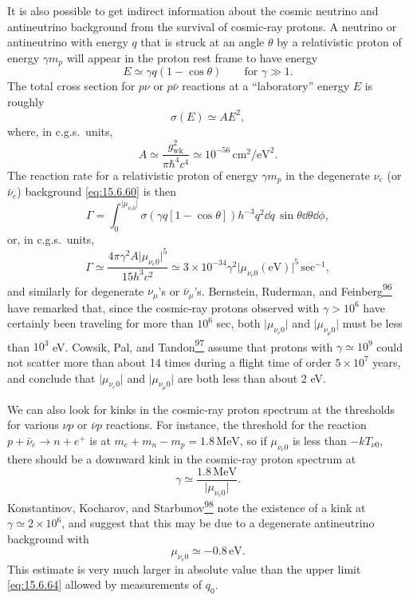 It is also possible to get indirect information about the cosmic neutrino and
antineutrino background from the survival of cosmic-ray protons. A neutrino or
antineutrino with energy \(q\) that is struck at an angle \(\theta\) by a
relativistic proton of energy \(\gamma m_p\) will appear in the proton rest
frame to have energy
\[
  E\simeq\gamma q(1-\cos\theta)
  \qquad\text{for }\gamma\gg1.
\]
The total cross section for \(p\nu\) or \(p\bar\nu\) reactions at a
``laboratory'' energy \(E\) is roughly
\[
  \sigma(E)\simeq AE^2,
\]
where, in c.g.s.\ units,
\[
  A
  \simeq
  \frac{g_{\mathrm{wk}}^2}{\pi\hbar^4c^4}
  \simeq
  10^{-56}\,\mathrm{cm^2/eV^2}.
\]
The reaction rate for a relativistic proton of energy \(\gamma m_p\) in the
degenerate \(\nu_e\) (or \(\bar\nu_e\)) background \eqref{eq:15.6.60} is then
\[
  \Gamma
  =
  \int_0^{\lvert\mu_{\nu_e0}\rvert}
  \sigma\!\left(\gamma q[1-\cos\theta]\right)
  h^{-3}q^2\dd q\,
  \sin\theta\dd\theta\dd\phi,
\]
or, in c.g.s.\ units,
\begin{equation}
  \Gamma
  \simeq
  \frac{4\pi\gamma^2A\lvert\mu_{\nu_e0}\rvert^5}
       {15h^3c^2}
  \simeq
  3\times10^{-34}\gamma^2
  \lvert\mu_{\nu_e0}(\mathrm{eV})\rvert^5\,\mathrm{sec^{-1}},
  \tag{15.6.68}\label{eq:15.6.68}
\end{equation}
and similarly for degenerate \(\nu_\mu\)'s or \(\bar\nu_\mu\)'s. Bernstein,
Ruderman, and Feinberg\hyperref[ch15-ref-96]{\textsuperscript{96}} have
remarked that, since the cosmic-ray protons observed with \(\gamma>10^6\)
have certainly been traveling for more than \(10^6\) sec, both
\(\lvert\mu_{\nu_e0}\rvert\) and \(\lvert\mu_{\nu_\mu0}\rvert\) must be less
than \(10^3\) eV. Cowsik, Pal, and
Tandon\hyperref[ch15-ref-97]{\textsuperscript{97}} assume that protons with
\(\gamma\simeq10^9\) could not scatter more than about 14 times during a
flight time of order \(5\times10^7\) years, and conclude that
\(\lvert\mu_{\nu_e0}\rvert\) and \(\lvert\mu_{\nu_\mu0}\rvert\) are both less
than about 2 eV.

We can also look for kinks in the cosmic-ray proton spectrum at the thresholds
for various \(\nu p\) or \(\bar\nu p\) reactions. For instance, the threshold
for the reaction \(p+\bar\nu_e\to n+e^+\) is at
\(m_e+m_n-m_p=1.8\,\mathrm{MeV}\), so if \(\mu_{\nu_e0}\) is less than
\(-kT_{\nu0}\), there should be a downward kink in the cosmic-ray proton
spectrum at
\begin{equation}
  \gamma
  \simeq
  \frac{1.8\,\mathrm{MeV}}{\lvert\mu_{\nu_e0}\rvert}.
  \tag{15.6.69}\label{eq:15.6.69}
\end{equation}
Konstantinov, Kocharov, and
Starbunov\hyperref[ch15-ref-98]{\textsuperscript{98}} note the existence of a
kink at \(\gamma\simeq2\times10^6\), and suggest that this may be due to a
degenerate antineutrino background with
\begin{equation}
  \mu_{\nu_e0}\simeq-0.8\,\mathrm{eV}.
  \tag{15.6.70}\label{eq:15.6.70}
\end{equation}
This estimate is very much larger in absolute value than the upper limit
\eqref{eq:15.6.64} allowed by measurements of \(q_0\).
